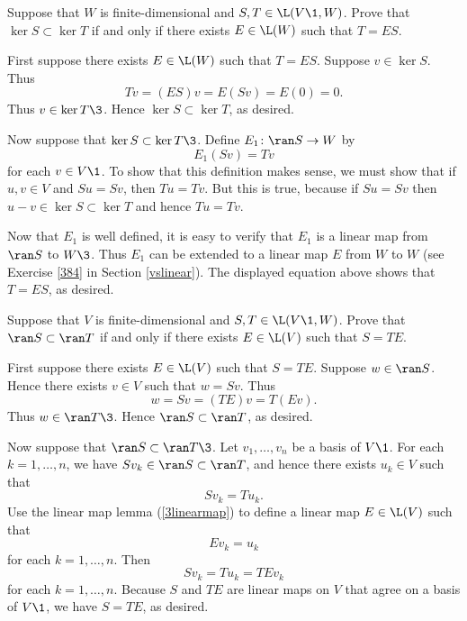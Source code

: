 \exercise\label{kerT1}
Suppose that $W$ is finite-dimensional and $S, T \in \L(V\1, W)$. Prove that $\ker S \subset \ker T$ if and only if there exists $E \in \L(W)$ such that \mbox{$T = E S$}.

\begin{Solution}
First suppose there exists $E \in \L(W)$ such that $T = E S$. Suppose $v \in \ker S$. Thus
\[
T v = (ES)v = E(Sv) = E(0) = 0.
\]
Thus $v \in \ker T\3$. Hence $\ker S \subset \ker T$, as desired.

Now suppose that $\ker S \subset \ker T\3$. Define $E_1 \colon \ran S \to W$ by
\[
E_1(S v) = T v
\]
for each $v \in V\1$. To show that this definition makes sense, we must show that if $u, v \in V$ and $S u = S v$, then $T u = T v$. But this is true, because if $Su = Sv$ then $u - v \in \ker S \subset \ker T$ and hence $T u = T v$.

Now that $E_1$ is well defined, it is easy to verify that $E_1$ is a linear map from $\ran S$ to $W\3$. Thus $E_1$ can be extended to a linear map $E$ from $W$ to $W$ (see Exercise \ref{384} in Section \ref{vslinear}). The displayed equation above shows that $T = ES$, as desired.
\end{Solution}

\exercise
Suppose that $V$ is finite-dimensional and $S, T \in \L(V\1, W)$. Prove that $\ran S \subset \ran T$ if and only if there exists $E \in \L(V)$ such that \mbox{$S = T E$}.

\begin{Solution}
First suppose there exists $E \in \L(V)$ such that $S = T E $. Suppose $w \in \ran S$. Hence there exists $v \in V$ such that $w = Sv$. Thus
\[
w = S v = (TE)v = T(Ev).
\]
Thus $w \in \ran T\3$. Hence $\ran S \subset \ran T$, as desired.

Now suppose that $\ran S \subset \ran T\3$. Let $v_1, \dots, v_n$ be a basis of $V\1$. For each $k = 1, \dots, n$,  we have $S v_k \in \ran S \subset \ran T$, and hence there exists $u_k \in V$ such that
\[
S v_k = T u_k.
\]
Use the linear map lemma (\ref{3linearmap}) to define a linear map $E\in \L(V)$ such that
\[
Ev_k = u_k
\]
for each $k = 1, \dots, n$. Then
\[
S v_k = T u_k = T E v_k
\]
for each $k = 1, \dots, n$. Because $S$ and $TE$ are linear maps on $V$ that agree on a basis of $V\1$, we have $S = T E$, as desired.
\end{Solution}

